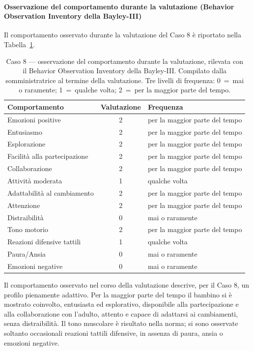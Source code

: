 \paragraph*{Osservazione del comportamento durante la valutazione (Behavior Observation Inventory della Bayley-III)}

Il comportamento osservato durante la valutazione del Caso 8 è riportato nella Tabella~\ref{tab:caso8_boi}.

\begin{table}[htbp]
\centering
\caption[Caso 8 --- osservazione del comportamento durante la valutazione]{Caso 8 --- osservazione del comportamento durante la valutazione, rilevata con il Behavior Observation Inventory della Bayley-III. Compilato dalla somministratrice al termine della valutazione. Tre livelli di frequenza: 0~=~mai o raramente; 1~=~qualche volta; 2~=~per la maggior parte del tempo.}
\label{tab:caso8_boi}
\begin{tabular}{|l|c|l|}
\toprule
\textbf{Comportamento} & \textbf{Valutazione} & \textbf{Frequenza} \\
\midrule
Emozioni positive & 2 & per la maggior parte del tempo \\
Entusiasmo & 2 & per la maggior parte del tempo \\
Esplorazione & 2 & per la maggior parte del tempo \\
Facilità alla partecipazione & 2 & per la maggior parte del tempo \\
Collaborazione & 2 & per la maggior parte del tempo \\
Attività moderata & 1 & qualche volta \\
Adattabilità al cambiamento & 2 & per la maggior parte del tempo \\
Attenzione & 2 & per la maggior parte del tempo \\
Distraibilità & 0 & mai o raramente \\
Tono motorio & 2 & per la maggior parte del tempo \\
Reazioni difensive tattili & 1 & qualche volta \\
Paura/Ansia & 0 & mai o raramente \\
Emozioni negative & 0 & mai o raramente \\
\bottomrule
\end{tabular}
\end{table}

Il comportamento osservato nel corso della valutazione descrive, per il Caso 8, un profilo pienamente adattivo. Per la maggior parte del tempo il bambino si è mostrato coinvolto, entusiasta ed esplorativo, disponibile alla partecipazione e alla collaborazione con l'adulto, attento e capace di adattarsi ai cambiamenti, senza distraibilità. Il tono muscolare è risultato nella norma; si sono osservate soltanto occasionali reazioni tattili difensive, in assenza di paura, ansia o emozioni negative.

